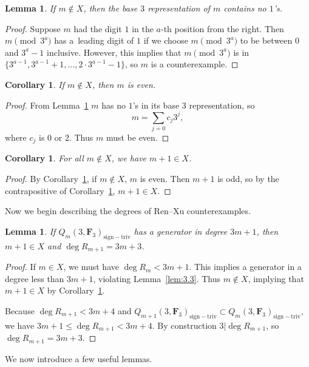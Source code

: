 \documentclass[11pt]{article}
\numberwithin{equation}{section}
\newtheorem{Corollary}[Theorem]{Corollary}
\newtheorem{Lemma}[Theorem]{Lemma}
\theoremstyle{definition}
\numberwithin{equation}{section}
\newcommand{\siv}{\mathrm{sign-triv}}
\begin{document}
\begin{Lemma} \label{noOnes}
 If $m\not\in X$, then the base $3$ representation of $m$ contains no $1$'s.
\end{Lemma}
\begin{proof}
 Suppose $m$ had the digit $1$ in the $a$-th position from the right. Then $m\pmod{3^a}$ has a~leading digit of $1$ if we choose $m\pmod{3^a}$ to be between $0$ and $3^a-1$ inclusive. However, this implies that $m \pmod{3^a}$ is in $\bigl\{3^{a-1},3^{a-1}+1,\dots,2\cdot 3^{a-1}-1\bigr\}$, so $m$ is a counterexample.
\end{proof}

\begin{Corollary}\label{evenCounter}
 If $m\not\in X$, then $m$ is even.
\end{Corollary}
\begin{proof}
 From Lemma~\ref{noOnes} $m$ has no $1$'s in its base $3$ representation, so
 \[m=\sum_{j=0}c_j3^j,\]
 where $c_j$ is $0$ or $2$. Thus $m$ must be even.
\end{proof}

\begin{Corollary}\label{noConsec}
 For all $m\not\in X$, we have $m+1\in X$.
\end{Corollary}
\begin{proof}
 By Corollary~\ref{evenCounter}, if $m\not\in X$, $m$ is even. Then $m+1$ is odd, so by the contrapositive of Corollary~\ref{evenCounter}, $m+1\in X$.
\end{proof}

Now we begin describing the degrees of Ren--Xu counterexamples.

\begin{Lemma} \label{countEx3m+3}
 If $Q_m(3,\mathbf{F}_3)_{\siv}$ has a generator in degree $3m+1$, then $m+1\in X$ and $\deg R_{m+1}=3m+3$.
\end{Lemma}
\begin{proof}
 If $m\in X$, we must have $\deg R_m<3m+1$. This implies a generator in a degree less than $3m+1$, violating Lemma~\ref{lem:3.3}. Thus $m\not\in X$, implying that $m+1\in X$ by Corollary~\ref{noConsec}.

 Because $\deg R_{m+1}<3m+4$ and $Q_{m+1}(3,\mathbf{F}_3)_\siv\subset Q_{m}(3,\mathbf{F}_3)_\siv$, we have $3m+1\leq\deg R_{m+1}< 3m+4$. By construction $3|\deg R_{m+1}$, so $\deg R_{m+1}= 3m+3$.
\end{proof}

We now introduce a few useful lemmas.
\end{document}
